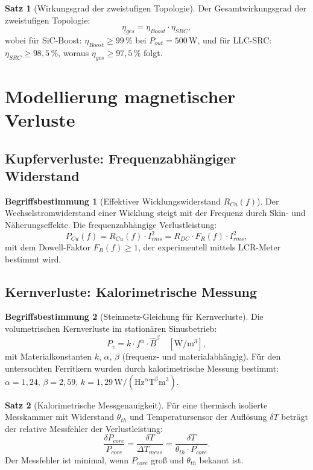 ﻿\documentclass[a4paper,12pt,openany,oneside]{book}
\newcommand{\abschnitt}[1]{\section{#1}}
\newcommand{\unterabschnitt}[1]{\subsection{#1}}
\theoremstyle{definition}
\newtheorem{definition}{Begriffsbestimmung}[chapter]
\newtheorem{satz}{Satz}[chapter]
\begin{document}
\begin{satz}[Wirkungsgrad der zweistufigen Topologie]
  Der Gesamtwirkungsgrad der zweistufigen Topologie:
  \[
    \eta_{ges} = \eta_{Boost} \cdot \eta_{SRC},
  \]
  wobei f\"ur SiC-Boost: $\eta_{Boost} \geq 99\,\%$ bei $P_{out} = 500\,\mathrm{W}$,
  und f\"ur LLC-SRC: $\eta_{SRC} \geq 98{,}5\,\%$, woraus $\eta_{ges} \geq 97{,}5\,\%$ folgt.
\end{satz}

\abschnitt{Modellierung magnetischer Verluste}

\unterabschnitt{Kupferverluste: Frequenzabh\"angiger Widerstand}

\begin{definition}[Effektiver Wicklungswiderstand $R_{Cu}(f)$]
  Der Wechselstromwiderstand einer Wicklung steigt mit der Frequenz durch Skin- und
  N\"aherungseffekte. Die frequenzabh\"angige Verlustleistung:
  \[
    P_{Cu}(f) = R_{Cu}(f) \cdot I_{rms}^2
    = R_{DC} \cdot F_R(f) \cdot I_{rms}^2,
  \]
  mit dem Dowell-Faktor $F_R(f) \geq 1$, der experimentell mittels LCR-Meter bestimmt wird.
\end{definition}

\unterabschnitt{Kernverluste: Kalorimetrische Messung}

\begin{definition}[Steinmetz-Gleichung f\"ur Kernverluste]
  Die volumetrischen Kernverluste im station\"aren Sinusbetrieb:
  \[
    P_v = k \cdot f^\alpha \cdot \hat{B}^\beta \quad [\mathrm{W/m^3}],
  \]
  mit Materialkonstanten $k$, $\alpha$, $\beta$ (frequenz- und materialabh\"angig).
  F\"ur den untersuchten Ferritkern wurden durch kalorimetrische Messung bestimmt:
  $\alpha = 1{,}24$, $\beta = 2{,}59$, $k = 1{,}29\,\mathrm{W/(Hz^\alpha T^\beta m^3)}$.
\end{definition}

\begin{satz}[Kalorimetrische Messgenauigkeit]
  F\"ur eine thermisch isolierte Messkammer mit Widerstand $\theta_{th}$ und
  Temperatursensor der Aufl\"osung $\delta T$ betr\"agt der relative Messfehler
  der Verlustleistung:
  \[
    \frac{\delta P_{core}}{P_{core}} = \frac{\delta T}{\Delta T_{mess}}
    = \frac{\delta T}{\theta_{th} \cdot P_{core}}.
  \]
  Der Messfehler ist minimal, wenn $P_{core}$ gro\ss{} und $\theta_{th}$ bekannt ist.
\end{satz}
\end{document}

